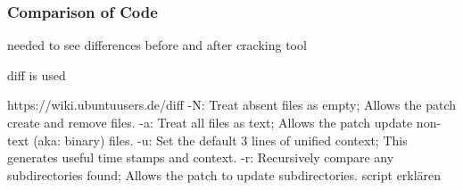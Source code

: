 \subsubsection{Comparison of Code}\label{subsubsection:forensics-tools-diff}
needed to see differences before and after cracking tool\newline

diff is used\newline

https://wiki.ubuntuusers.de/diff\newline
-N: Treat absent files as empty; Allows the patch create and remove files.\newline
-a: Treat all files as text; Allows the patch update non-text (aka: binary) files.\newline
-u: Set the default 3 lines of unified context; This generates useful time stamps and context.\newline
-r: Recursively compare any subdirectories found; Allows the patch to update subdirectories.\newline
script erklären\newline
